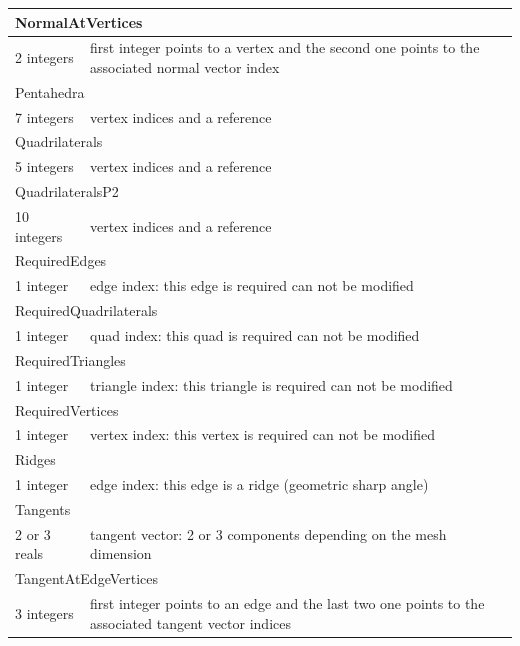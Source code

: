\documentclass[a4paper,12pt]{article}
\begin{document}
\begin{longtable}{|m{4cm}|m{11cm}|}
\multicolumn{2}{|l|}{NormalAtVertices} \\
\hline
2 integers & first integer points to a vertex and the second one points to the associated normal vector index \\
\hline\hline

\multicolumn{2}{|l|}{Pentahedra} \\
\hline
7 integers & vertex indices and a reference \\
\hline\hline

\multicolumn{2}{|l|}{Quadrilaterals} \\
\hline
5 integers & vertex indices and a reference \\
\hline\hline

\multicolumn{2}{|l|}{QuadrilateralsP2} \\
\hline
10 integers & vertex indices and a reference \\
\hline\hline

\multicolumn{2}{|l|}{RequiredEdges} \\
\hline
1 integer & edge index: this edge is required can not be modified \\
\hline\hline

\multicolumn{2}{|l|}{RequiredQuadrilaterals} \\
\hline
1 integer & quad index: this quad is required can not be modified \\
\hline\hline

\multicolumn{2}{|l|}{RequiredTriangles} \\
\hline
1 integer & triangle index: this triangle is required can not be modified \\
\hline\hline

\multicolumn{2}{|l|}{RequiredVertices} \\
\hline
1 integer & vertex index: this vertex is required can not be modified \\
\hline\hline

\multicolumn{2}{|l|}{Ridges} \\
\hline
1 integer & edge index: this edge is a ridge (geometric sharp angle) \\
\hline\hline

\multicolumn{2}{|l|}{Tangents} \\
\hline
2 or 3 reals & tangent vector: 2 or 3 components depending on the mesh dimension \\
\hline\hline

\multicolumn{2}{|l|}{TangentAtEdgeVertices} \\
\hline
3 integers & first integer points to an edge and the last two one points to the associated tangent vector indices \\
\hline\hline


\end{longtable}
\end{document}

